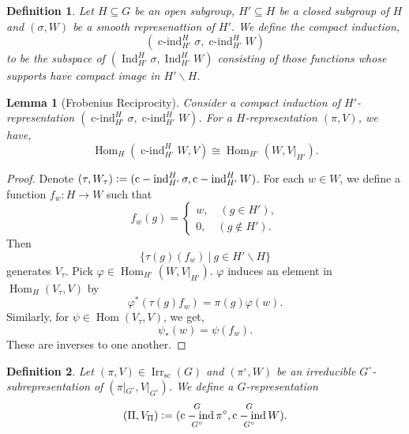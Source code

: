 \documentclass[8pt]{article}
\newtheorem{definition}{Definition}[section]
\newtheorem{lemma}{Lemma}[section]
\DeclareMathOperator{\Ind}{Ind}
\DeclareMathOperator{\cind}{c-ind}
\DeclareMathOperator{\Hom}{Hom}
\DeclareMathOperator{\supcus}{sc}
\DeclareMathOperator{\Irr}{Irr}
\newcommand{\defeq}{\vcentcolon=}
\newcommand{\sep}[0]{\:|\:}
\begin{document}
\begin{definition}
  Let $H\subseteq G$ be an open subgroup, $H'\subseteq H$ be a closed subgroup of $H$ and $(\sigma,W)$ be a smooth represenattion of $H'$. We define the compact induction,
  \begin{equation*}
    (\cind_{H'}^H\sigma,\cind_{H'}^HW)
  \end{equation*}
  to be the subspace of $(\Ind_{H'}^H\sigma,\Ind_{H'}^HW)$ consisting of those functions whose supports have compact image in $H'\backslash H$.
\end{definition}
\begin{lemma}[Frobenius Reciprocity]
  \label{lemma_61}\label{lemma_frobenius_reciprocity_compact_induction}
  Consider a compact induction of $H'$-representation $(\cind_{H'}^H\sigma,\cind_{H'}^H W)$. For a $H$-representation $(\pi,V)$, we have,
  \begin{equation*}
    \Hom_H(\cind_{H'}^HW,V) \cong \Hom_{H'}(W,V|_{H'}).
  \end{equation*}
\end{lemma}
\begin{proof}
  Denote $(\tau,W_\tau)\defeq (\cind_{H'}^H\sigma,\cind_{H'}^H W)$. For each $w\in W$, we define a function $f_w:H\to W$ such that
  \begin{equation*}
    f_w(g) = \begin{cases}
      w,\quad(g\in H'),\\
      0,\quad(g\not\in H').
    \end{cases}
  \end{equation*}
  Then 
  \begin{equation*}
    \{\tau(g)(f_w)\sep g\in H'\backslash H\}
  \end{equation*}
  generates $V_\tau$. Pick $\varphi\in\Hom_{H'}(W,V|_{H'})$. $\varphi$ induces an element in $\Hom_H(V_\tau,V)$ by 
  \begin{equation*}
    \varphi^*(\tau(g)f_w) = \pi(g)\varphi(w).
  \end{equation*}
  Similarly, for $\psi\in\Hom(V_\tau,V)$, we get,
  \begin{equation*}
    \psi_*(w) = \psi(f_w).
  \end{equation*}
  These are inverses to one another.
\end{proof}
\begin{definition}
  Let $(\pi,V)\in\Irr_{\supcus}(G)$ and $(\pi^\circ,W)$ be an irreducible $G^\circ$-subrepresentation of $(\pi|_{G^\circ},V|_{G^\circ})$. We define a $G$-representation
  \begin{equation*}
    (\Pi,V_\Pi)\defeq  (\cind_{G^\circ}^G\pi^\circ,\cind_{G^\circ}^G W).
  \end{equation*}
\end{definition}
\end{document}
